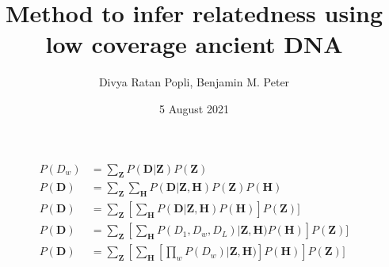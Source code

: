 \documentclass[12pt, letterpaper]{article}
\title{Method to infer relatedness using low coverage ancient DNA}
\author{Divya Ratan Popli, Benjamin M. Peter}
\date{5 August 2021}
\newcommand{\BZ}{\mathbf{Z}}
\newcommand{\BD}{\mathbf{D}}
\newcommand{\BH}{\mathbf{H}}
\begin{document}
\begin{align}
    P(D_w) &= \sum_{\BZ} P(\BD | \BZ)P(\BZ)\\
    P(\BD) &= \sum_{\BZ}\sum_{\BH} P(\BD | \BZ, \BH)P(\BZ) P(\BH)\\
    P(\BD) &= \sum_{\BZ}[\sum_{\BH} P(\BD | \BZ, \BH)P(\BH)]P(\BZ)] \\
    P(\BD) &= \sum_{\BZ}[\sum_{\BH}  P(D_1, D_w, D_L) | \BZ, \BH)P(\BH)]P(\BZ)] \\    
    P(\BD) &= \sum_{\BZ}[\sum_{\BH}  \left[\prod_w P(D_w) | \BZ, \BH)\right] P(\BH)]P(\BZ)] \\       
\end{align}
    
\end{document}
